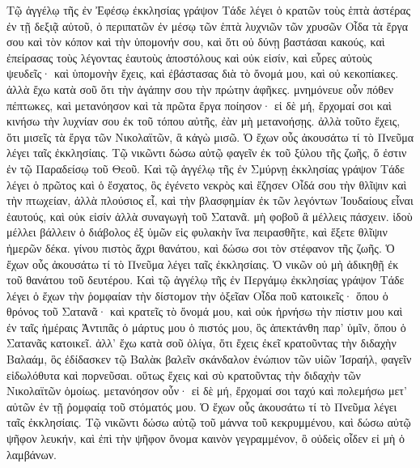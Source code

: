 \begin{pages}
    \begin{Rightside}
        \beginnumbering
			Τῷ ἀγγέλῳ τῆς ἐν Ἐφέσῳ ἐκκλησίας γράψον Τάδε λέγει ὁ κρατῶν τοὺς ἑπτὰ ἀστέρας ἐν τῇ δεξιᾷ αὐτοῦ, ὁ περιπατῶν ἐν μέσῳ τῶν ἑπτὰ λυχνιῶν τῶν χρυσῶν Οἶδα τὰ ἔργα σου καὶ τὸν κόπον καὶ τὴν ὑπομονήν σου, καὶ ὅτι οὐ δύνῃ βαστάσαι κακούς, καὶ ἐπείρασας τοὺς λέγοντας ἑαυτοὺς ἀποστόλους καὶ οὐκ εἰσίν, καὶ εὗρες αὐτοὺς ψευδεῖς· καὶ ὑπομονὴν ἔχεις, καὶ ἐβάστασας διὰ τὸ ὄνομά μου, καὶ οὐ κεκοπίακες. 
		\pend 
		\pstart
			ἀλλὰ ἔχω κατὰ σοῦ ὅτι τὴν ἀγάπην σου τὴν πρώτην ἀφῆκες. μνημόνευε οὖν πόθεν πέπτωκες, καὶ μετανόησον καὶ τὰ πρῶτα ἔργα ποίησον· εἰ δὲ μή, ἔρχομαί σοι καὶ κινήσω τὴν λυχνίαν σου ἐκ τοῦ τόπου αὐτῆς, ἐὰν μὴ μετανοήσῃς.
		\pend
		\pstart
			ἀλλὰ τοῦτο ἔχεις, ὅτι μισεῖς τὰ ἔργα τῶν Νικολαϊτῶν, ἃ κἀγὼ μισῶ. Ὁ ἔχων οὖς ἀκουσάτω τί τὸ Πνεῦμα λέγει ταῖς ἐκκλησίαις. Τῷ νικῶντι δώσω αὐτῷ φαγεῖν ἐκ τοῦ ξύλου τῆς ζωῆς, ὅ ἐστιν ἐν τῷ Παραδείσῳ τοῦ Θεοῦ.
		\pend
		\pstart
			Καὶ τῷ ἀγγέλῳ τῆς ἐν Σμύρνῃ ἐκκλησίας γράψον Τάδε λέγει ὁ πρῶτος καὶ ὁ ἔσχατος, ὃς ἐγένετο νεκρὸς καὶ ἔζησεν Οἶδά σου τὴν θλῖψιν καὶ τὴν πτωχείαν, ἀλλὰ πλούσιος εἶ, καὶ τὴν βλασφημίαν ἐκ τῶν λεγόντων Ἰουδαίους εἶναι ἑαυτούς, καὶ οὐκ εἰσίν ἀλλὰ συναγωγὴ τοῦ Σατανᾶ. μὴ φοβοῦ ἃ μέλλεις πάσχειν. ἰδοὺ μέλλει βάλλειν ὁ διάβολος ἐξ ὑμῶν εἰς φυλακὴν ἵνα πειρασθῆτε, καὶ ἕξετε θλῖψιν ἡμερῶν δέκα. γίνου πιστὸς ἄχρι θανάτου, καὶ δώσω σοι τὸν στέφανον τῆς ζωῆς. Ὁ ἔχων οὖς ἀκουσάτω τί τὸ Πνεῦμα λέγει ταῖς ἐκκλησίαις. Ὁ νικῶν οὐ μὴ ἀδικηθῇ ἐκ τοῦ θανάτου τοῦ δευτέρου.
		\pend
		\pstart
			Καὶ τῷ ἀγγέλῳ τῆς ἐν Περγάμῳ ἐκκλησίας γράψον Τάδε λέγει ὁ ἔχων τὴν ῥομφαίαν τὴν δίστομον τὴν ὀξεῖαν Οἶδα ποῦ κατοικεῖς· ὅπου ὁ θρόνος τοῦ Σατανᾶ· καὶ κρατεῖς τὸ ὄνομά μου, καὶ οὐκ ἠρνήσω τὴν πίστιν μου καὶ ἐν ταῖς ἡμέραις Ἀντιπᾶς ὁ μάρτυς μου ὁ πιστός μου, ὃς ἀπεκτάνθη παρ’ ὑμῖν, ὅπου ὁ Σατανᾶς κατοικεῖ.
		\pend
		\pstart	
			ἀλλ’ ἔχω κατὰ σοῦ ὀλίγα, ὅτι ἔχεις ἐκεῖ κρατοῦντας τὴν διδαχὴν Βαλαάμ, ὃς ἐδίδασκεν τῷ Βαλὰκ βαλεῖν σκάνδαλον ἐνώπιον τῶν υἱῶν Ἰσραήλ, φαγεῖν εἰδωλόθυτα καὶ πορνεῦσαι. οὕτως ἔχεις καὶ σὺ κρατοῦντας τὴν διδαχὴν τῶν Νικολαϊτῶν ὁμοίως. μετανόησον οὖν· εἰ δὲ μή, ἔρχομαί σοι ταχύ καὶ πολεμήσω μετ’ αὐτῶν ἐν τῇ ῥομφαίᾳ τοῦ στόματός μου. Ὁ ἔχων οὖς ἀκουσάτω τί τὸ Πνεῦμα λέγει ταῖς ἐκκλησίαις. Τῷ νικῶντι δώσω αὐτῷ τοῦ μάννα τοῦ κεκρυμμένου, καὶ δώσω αὐτῷ ψῆφον λευκήν, καὶ ἐπὶ τὴν ψῆφον ὄνομα καινὸν γεγραμμένον, ὃ οὐδεὶς οἶδεν εἰ μὴ ὁ λαμβάνων.

\end{Rightside}
\end{pages}
